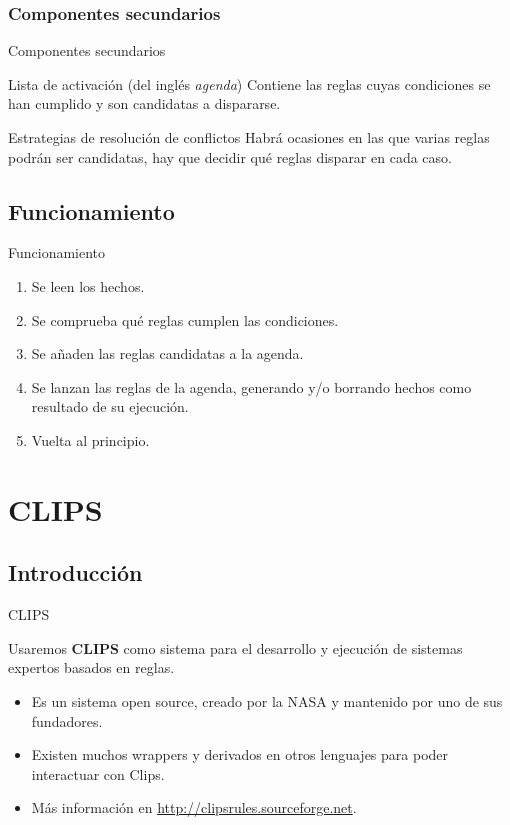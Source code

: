 \documentclass[smaller,spanish,xcolor=svgnames]{beamer}
\begin{document}
\subsubsection{Componentes secundarios}

\begin{frame}{Componentes secundarios}
    \begin{block}{Lista de activación (del inglés \textit{agenda})}
      Contiene las reglas cuyas condiciones se han cumplido y son candidatas a
      dispararse.
    \end{block}

    \begin{block}{Estrategias de resolución de conflictos}
      Habrá ocasiones en las que varias reglas podrán ser candidatas, hay que
      decidir qué reglas disparar en cada caso.
    \end{block}  
\end{frame}

\subsection{Funcionamiento}
\begin{frame}{Funcionamiento}
  \begin{enumerate}
  \item Se leen los hechos.
  \item Se comprueba qué reglas cumplen las condiciones.
  \item Se añaden las reglas candidatas a la agenda.
  \item Se lanzan las reglas de la agenda, generando y/o borrando hechos como resultado de su ejecución.
  \item Vuelta al principio.
  \end{enumerate}

\end{frame}

\section{CLIPS}

\subsection{Introducción}

\begin{frame}{CLIPS}
  \begin{block}{}
    Usaremos \textbf{CLIPS} como sistema para el desarrollo y ejecución de
    sistemas expertos basados en reglas.
  \end{block}

  \begin{itemize}
  \item Es un sistema open source, creado por la NASA y mantenido por uno de sus
    fundadores.
  \item Existen muchos wrappers y derivados en otros lenguajes para poder
    interactuar con Clips.
  \item Más información en \url{http://clipsrules.sourceforge.net}.
  \end{itemize}
\end{frame}
\end{document}
